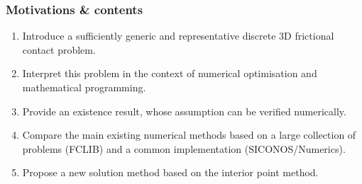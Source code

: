 \documentclass[8pt,red]{beamer}
\renewcommand{\tr}[1]{\textcolor{red}{#1}}
\begin{document}

  

\begin{frame}
  \frametitle{Motivations \&  contents}

  \begin{enumerate}
  \item Introduce a sufficiently generic and representative discrete 3D frictional contact problem.
  \item Interpret this problem in the context of numerical optimisation and mathematical programming.
  \item Provide an existence result, whose assumption can be verified numerically.
  \item Compare the main existing numerical methods based on a large collection of problems (FCLIB) and a common implementation (SICONOS/Numerics).
  \item Propose a new solution method based on the interior point method.
  \end{enumerate}
  \addtocounter{page}{-2}
\end{frame}

\frame{\thispagestyle{empty}\tableofcontents\addtocounter{framenumber}{-1}}


%


\frame{\thispagestyle{empty}\tableofcontents\addtocounter{framenumber}{-1}}


\frame{\thispagestyle{empty}\tableofcontents\addtocounter{framenumber}{-1}}



\frame{\thispagestyle{empty}\tableofcontents\addtocounter{framenumber}{-1}}
\end{document}
